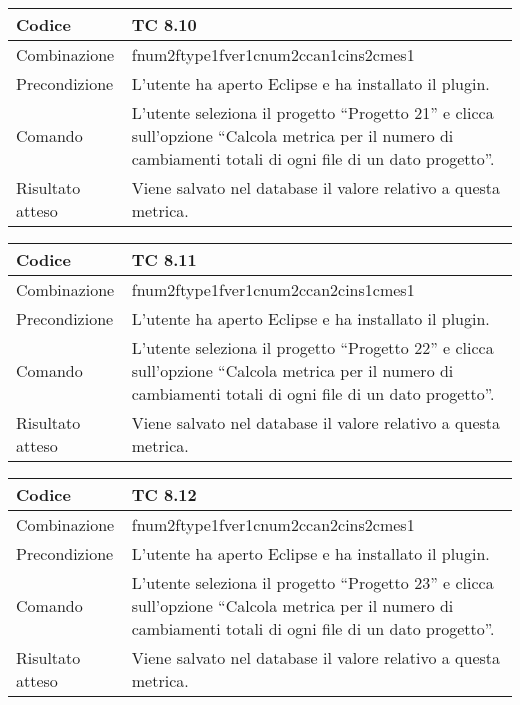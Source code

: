 \begin{table}[ht]
\begin{tabular}{|p{3cm}|p{9cm}|}
\hline
\cellcolor{lightgray}Codice				& TC 8.10								\\
\hline
\cellcolor{lightgray}Combinazione		& fnum2ftype1fver1cnum2ccan1cins2cmes1									\\
\hline
\cellcolor{lightgray}Precondizione		& L'utente ha aperto Eclipse e ha installato il plugin.		\\
\hline
\cellcolor{lightgray}Comando			& L'utente seleziona il progetto ``Progetto 21''  e clicca sull'opzione ``Calcola metrica per il numero di cambiamenti totali di ogni file di un dato progetto''.	\\
\hline
\cellcolor{lightgray}Risultato atteso	& Viene salvato nel database il valore relativo a questa metrica.\\
\hline
\end{tabular}
\end{table}

\begin{table}[ht]
\begin{tabular}{|p{3cm}|p{9cm}|}
\hline
\cellcolor{lightgray}Codice				& TC 8.11								\\
\hline
\cellcolor{lightgray}Combinazione		& fnum2ftype1fver1cnum2ccan2cins1cmes1									\\
\hline
\cellcolor{lightgray}Precondizione		& L'utente ha aperto Eclipse e ha installato il plugin.		\\
\hline
\cellcolor{lightgray}Comando			& L'utente seleziona il progetto ``Progetto 22''  e clicca sull'opzione ``Calcola metrica per il numero di cambiamenti totali di ogni file di un dato progetto''.	\\
\hline
\cellcolor{lightgray}Risultato atteso	& Viene salvato nel database il valore relativo a questa metrica.\\
\hline
\end{tabular}
\end{table}

\begin{table}[ht]
\begin{tabular}{|p{3cm}|p{9cm}|}
\hline
\cellcolor{lightgray}Codice				& TC 8.12								\\
\hline
\cellcolor{lightgray}Combinazione		& fnum2ftype1fver1cnum2ccan2cins2cmes1									\\
\hline
\cellcolor{lightgray}Precondizione		& L'utente ha aperto Eclipse e ha installato il plugin.		\\
\hline
\cellcolor{lightgray}Comando			& L'utente seleziona il progetto ``Progetto 23''  e clicca sull'opzione 
``Calcola metrica per il numero di cambiamenti totali di ogni file di un dato progetto''.	\\
\hline
\cellcolor{lightgray}Risultato atteso	& Viene salvato nel database il valore relativo a questa metrica.\\
\hline
\end{tabular}
\end{table}


